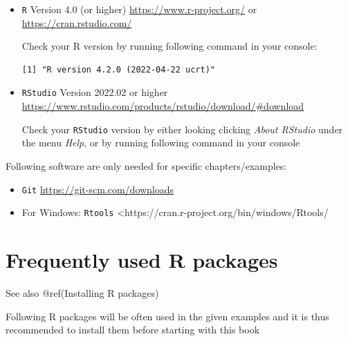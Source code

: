 \documentclass[
  letterpaper,
  DIV=11,
  numbers=noendperiod]{scrreprt}
\newenvironment{Shaded}{\begin{snugshade}}{\end{snugshade}}
\newcommand{\CommentTok}[1]{\textcolor[rgb]{0.37,0.37,0.37}{#1}}
\newcommand{\FunctionTok}[1]{\textcolor[rgb]{0.28,0.35,0.67}{#1}}
\newcommand{\NormalTok}[1]{\textcolor[rgb]{0.00,0.23,0.31}{#1}}
\newcommand{\SpecialCharTok}[1]{\textcolor[rgb]{0.37,0.37,0.37}{#1}}
\providecommand{\tightlist}{%
  \setlength{\itemsep}{0pt}\setlength{\parskip}{0pt}}\usepackage{longtable,booktabs,array}
\begin{document}
\begin{itemize}
\item
  \texttt{R} Version 4.0 (or higher) \url{https://www.r-project.org/} or
  \url{https://cran.rstudio.com/}

  Check your R version by running following command in your console:

\begin{Shaded}
\end{Shaded}

\begin{verbatim}
[1] "R version 4.2.0 (2022-04-22 ucrt)"
\end{verbatim}
\item
  \texttt{RStudio} Version 2022.02 or higher
  \url{https://www.rstudio.com/products/rstudio/download/\#download}

  Check your \texttt{RStudio} version by either looking clicking
  \emph{About RStudio} under the menu \emph{Help}, or by running
  following command in your console

\begin{Shaded}
\end{Shaded}
\end{itemize}

Following software are only needed for specific chapters/examples:

\begin{itemize}
\tightlist
\item
  \texttt{Git} \url{https://git-scm.com/downloads}
\item
  For Windows: \texttt{Rtools}
  \textless https://cran.r-project.org/bin/windows/Rtools/
\end{itemize}

\hypertarget{frequently-used-r-packages}{%
\section{Frequently used R packages}\label{frequently-used-r-packages}}

See also @ref(Installing R packages)

Following R packages will be often used in the given examples and it is
thus recommended to install them before starting with this book
\end{document}
